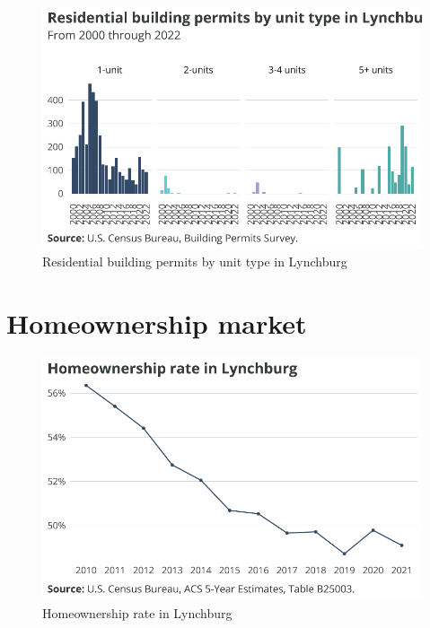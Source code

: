 \documentclass[
  letterpaper,
  DIV=11,
  numbers=noendperiod]{scrreprt}
\begin{document}
\begin{figure}[H]

{\centering \includegraphics{./part-3-3_files/figure-pdf/fig-bps-1.pdf}

}

\caption{\label{fig-bps}Residential building permits by unit type in
Lynchburg}

\end{figure}

\hypertarget{homeownership-market-2}{%
\section{Homeownership market}\label{homeownership-market-2}}

\begin{figure}[H]

{\centering \includegraphics{./part-3-3_files/figure-pdf/fig-ho-1.pdf}

}

\caption{\label{fig-ho}Homeownership rate in Lynchburg}

\end{figure}
\end{document}
